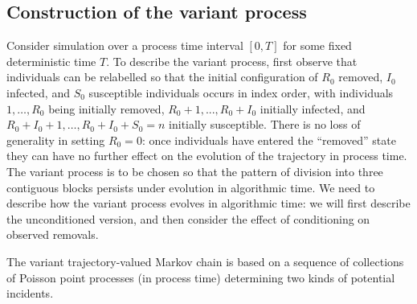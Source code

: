 \documentclass[]{article}
\begin{document}
\subsection{Construction of the variant process}\label{ssec:variant}
Consider simulation over a process time interval \([0,T]\) 
for some fixed deterministic time \(T\).
To describe the variant process, first
observe that
individuals 
can be relabelled 
so that the initial configuration of \(R_0\) removed, \(I_0\) infected, and \(S_0\) susceptible individuals occurs in index order, 
with individuals \(1, \ldots, R_0\) being initially removed,
\(R_0+1, ..., R_0+I_0\) initially infected,
and \(R_0+I_0+1, \ldots, R_0+I_0+S_0=n\) initially susceptible.
There is no loss of generality in setting \(R_0=0\):
once individuals have entered the ``removed'' state
they can have
no further effect
on the evolution of the trajectory in process time.
The variant process is to be chosen so that 
the pattern of division
into three contiguous blocks
persists under evolution in algorithmic time.
We need to describe how the variant process evolves in algorithmic time: 
we will first describe the unconditioned version,
and then consider the effect of conditioning on observed removals.

The variant trajectory-valued Markov chain 
is based on a sequence
of collections of
Poisson point processes (in process time)
determining two kinds of potential incidents.
\end{document}
